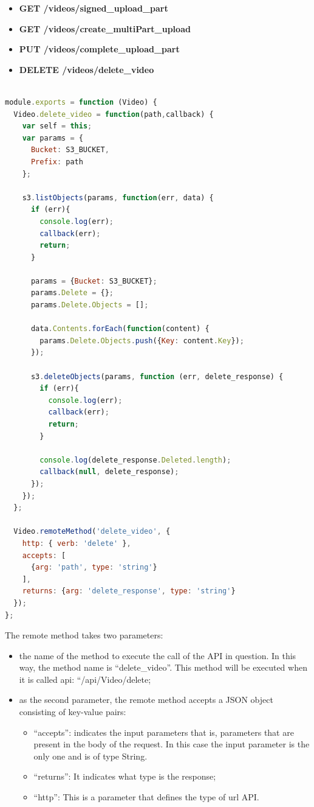 \begin{itemize}
\item \textbf{GET /videos/signed\_upload\_part }
\item \textbf{GET /videos/create\_multiPart\_upload}
\item \textbf{PUT /videos/complete\_upload\_part }
\item \textbf{DELETE /videos/delete\_video}
\end{itemize}

\begin{lstlisting}[language=javascript]

module.exports = function (Video) {
  Video.delete_video = function(path,callback) {
    var self = this;
    var params = {
      Bucket: S3_BUCKET,
      Prefix: path
    };

    s3.listObjects(params, function(err, data) {
      if (err){
        console.log(err);
        callback(err);
        return;
      } 

      params = {Bucket: S3_BUCKET};
      params.Delete = {};
      params.Delete.Objects = [];

      data.Contents.forEach(function(content) {
        params.Delete.Objects.push({Key: content.Key});
      });

      s3.deleteObjects(params, function (err, delete_response) {
        if (err){
          console.log(err);
          callback(err);
          return;
        }

        console.log(delete_response.Deleted.length);
        callback(null, delete_response);
      });
    });
  };

  Video.remoteMethod('delete_video', {
    http: { verb: 'delete' },
    accepts: [
      {arg: 'path', type: 'string'}
    ],
    returns: {arg: 'delete_response', type: 'string'}
  });
};
\end{lstlisting}

The remote method takes two parameters:
\begin{itemize}
\item the name of the method to execute the call of the API in question. In this way, the method name is “delete\_video”. This method will be executed when it is called api: “/api/Video/delete;
\item as the second parameter, the remote method accepts a JSON object consisting of key-value pairs:
  \begin{itemize}
    \item “accepts”: indicates the input parameters that is, parameters that are present in the body of the request. In this case the input parameter is the only one and is of type String.
    \item “returns”: It indicates what type is the response;
    \item “http”: This is a parameter that defines the type of url API.
  \end{itemize}
\end{itemize}


